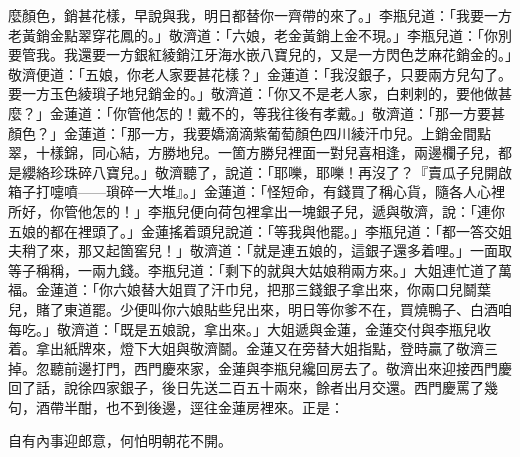 麼顏色，銷甚花樣，早說與我，明日都替你一齊帶的來了。」李瓶兒道：「我要一方老黃銷金點翠穿花鳳的。」敬濟道：「六娘，老金黃銷上金不現。」李瓶兒道：「你別要管我。我還要一方銀紅綾銷江牙海水嵌八寶兒的，又是一方閃色芝麻花銷金的。」敬濟便道：「五娘，你老人家要甚花樣？」金蓮道：「我沒銀子，只要兩方兒勾了。要一方玉色綾瑣子地兒銷金的。」敬濟道：「你又不是老人家，白剌剌的，要他做甚麼？」金蓮道：「你管他怎的！戴不的，等我往後有孝戴。」{}敬濟道：「那一方要甚顏色？」金蓮道：「那一方，我要嬌滴滴紫葡萄顏色四川綾汗巾兒。上銷金間點翠，十樣錦，同心結，方勝地兒。一箇方勝兒裡面一對兒喜相逢，兩邊欄子兒，都是纓絡珍珠碎八寶兒。」敬濟聽了，說道：「耶嚛，耶嚛！再沒了？『賣瓜子兒開啟箱子打嚏噴——瑣碎一大堆』。」金蓮道：「怪短命，有錢買了稱心貨，隨各人心裡所好，你管他怎的！」李瓶兒便向荷包裡拿出一塊銀子兒，遞與敬濟，說：「連你五娘的都在裡頭了。」金蓮搖着頭兒說道：「等我與他罷。」{}李瓶兒道：「都一答交姐夫稍了來，那又起箇窖兒！」敬濟道：「就是連五娘的，這銀子還多着哩。」一面取等子稱稱，一兩九錢。李瓶兒道：「剩下的就與大姑娘稍兩方來。」大姐連忙道了萬福。金蓮道：「你六娘替大姐買了汗巾兒，把那三錢銀子拿出來，你兩口兒鬬葉兒，賭了東道罷。{}少便叫你六娘貼些兒出來，{}明日等你爹不在，買燒鴨子、白酒咱每吃。」敬濟道：「既是五娘說，拿出來。」大姐遞與金蓮，金蓮交付與李瓶兒收着。拿出紙牌來，燈下大姐與敬濟鬬。金蓮又在旁替大姐指點，登時贏了敬濟三掉。忽聽前邊打門，西門慶來家，金蓮與李瓶兒纔回房去了。敬濟出來迎接西門慶回了話，說徐四家銀子，後日先送二百五十兩來，餘者出月交還。西門慶罵了幾句，酒帶半酣，也不到後邊，逕往金蓮房裡來。正是：

\begin{myquote}
自有內事迎郎意，何怕明朝花不開。
\end{myquote}


